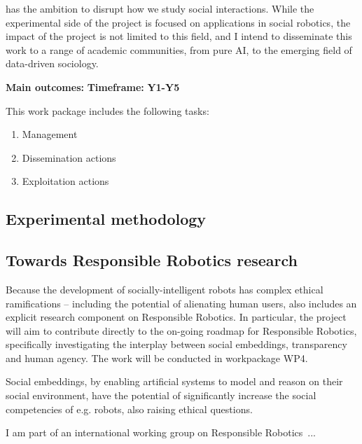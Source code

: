 \project has the ambition to disrupt how we study social interactions. While the
experimental side of the project is focused on applications in social robotics,
the impact of the project is not limited to this field, and I intend to
disseminate this work to a range of academic communities, from pure AI, to the
emerging field of data-driven sociology.


\begin{framed}
    \textbf{Main outcomes:} 
    \textbf{Timeframe:} \textbf{Y1-Y5}
\end{framed}

This work package includes the following tasks:

\begin{enumerate}[label=\textbf{T6.\arabic*}]
    \item Management
    \item Dissemination actions
    \item Exploitation actions
\end{enumerate}


\subsection{Experimental methodology}


\subsection{Towards Responsible Robotics research}


Because the development of socially-intelligent robots has
complex ethical ramifications -- including the potential of alienating
human users, \project also includes an explicit research component on
Responsible Robotics. In particular, the project will aim to contribute directly
to the on-going roadmap for Responsible Robotics, specifically
investigating the interplay between social embeddings, transparency and human
agency. The work will be conducted in workpackage WP4.


Social embeddings, by enabling artificial systems to model and reason on their
social environment, have the potential of significantly increase the social
competencies of e.g. robots, also raising ethical questions.

I am part of an international working group on Responsible Robotics~...

